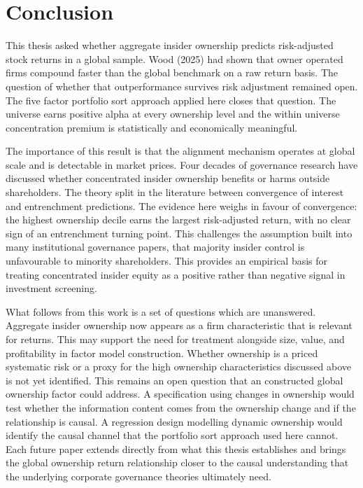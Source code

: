 
\section{Conclusion}

This thesis asked whether aggregate insider ownership predicts risk-adjusted stock returns in a global sample. Wood (2025) had shown that owner operated firms compound faster than the global benchmark on a raw return basis. The question of whether that outperformance survives risk adjustment remained open. The five factor portfolio sort approach applied here closes that question. The universe earns positive alpha at every ownership level and the within universe concentration premium is statistically and economically meaningful.

The importance of this result is that the alignment mechanism operates at global scale and is detectable in market prices. Four decades of governance research have discussed whether concentrated insider ownership benefits or harms outside shareholders. The theory split in the literature between convergence of interest and entrenchment predictions. The evidence here weighs in favour of convergence: the highest ownership decile earns the largest risk-adjusted return, with no clear sign of an entrenchment turning point. This challenges the assumption built into many institutional governance papers, that majority insider control is unfavourable to minority shareholders. This provides an empirical basis for treating concentrated insider equity as a positive rather than negative signal in investment screening.

What follows from this work is a set of questions which are unanswered. Aggregate insider ownership now appears as a firm characteristic that is relevant for returns. This may support the need for treatment alongside size, value, and profitability in factor model construction. Whether ownership is a priced systematic risk or a proxy for the high ownership characteristics discussed above is not yet identified. This remains an open question that an constructed global ownership factor could address. A specification using changes in ownership would test whether the information content comes from the ownership change and if the relationship is causal. A regression design modelling dynamic ownership would identify the causal channel that the portfolio sort approach used here cannot. Each future paper extends directly from what this thesis establishes and brings the global ownership return relationship closer to the causal understanding that the underlying corporate governance theories ultimately need. 
